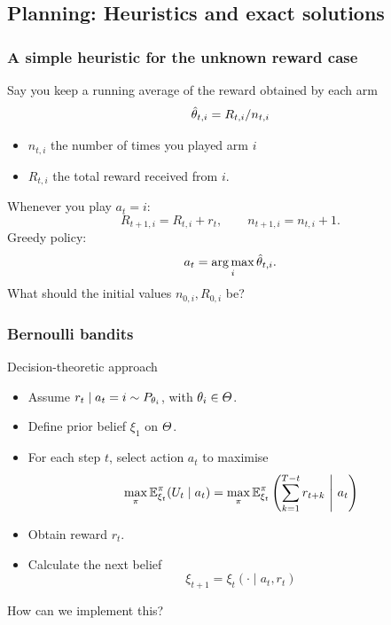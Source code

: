 \documentclass[9pt]{beamer}
\begin{document}
\subsection{Planning: Heuristics and exact solutions}
\label{sec:exp-design-bandit}


\begin{frame}
  \frametitle{A simple heuristic for the unknown reward case}
  Say you keep a \alert{running average} of the reward obtained by each arm
  \[
  \hat{\theta}_{t,i} = R_{t,i} / n_{t,i}
  \]
  \begin{itemize}
  \item $n_{t,i}$ the number of times you played arm $i$ 
  \item $R_{t,i}$ the total reward received from $i$.
  \end{itemize}
  Whenever you play $a_t = i$:
  \[
  R_{t+1, i} = R_{t,i} + r_t, \qquad n_{t+1,i} = n_{t,i} + 1.
  \]
  Greedy policy:
  \[
  a_t = \mathop{\rm arg\,max}_i \hat{\theta}_{t,i}.
  \]
  What should the initial values $n_{0,i}, R_{0,i}$ be?
\end{frame}


\begin{frame}
  \frametitle{Bernoulli bandits}
  \begin{block}{Decision-theoretic approach}
    \begin{itemize}
    \item Assume $r_t \mid a_t = i \sim P_{\theta_i}$, with $\theta_i\in \Theta$.
    \item Define prior belief  $\xi_1$ on $\Theta$.
    \item For each step $t$, select action $a_t$ to maximise 
      \[
        \max_\pi \mathop{\mbox{\ensuremath{\mathbb{E}}}}\nolimits^\pi_{\xi_t}( U_t  \mid a_t) = \max_\pi \mathop{\mbox{\ensuremath{\mathbb{E}}}}\nolimits^\pi_{\xi_t} \left(\sum_{k=1}^{T-t}  r_{t+k} ~\middle|~ a_t \right)
      \]
    \item Obtain reward $r_t$.
    \item Calculate the next belief
      \[
        \xi_{t+1} = \xi_t(\cdot \mid a_t, r_t)
      \]
    \end{itemize}
  \end{block}
  How can we implement this?
\end{frame}
\end{document}
